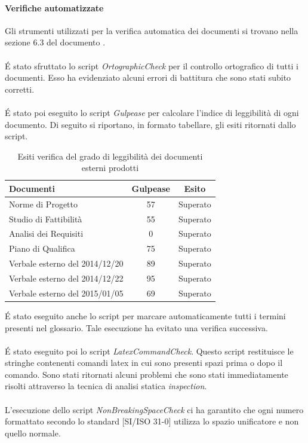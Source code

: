 				\paragraph{Verifiche automatizzate}
					Gli strumenti utilizzati per la verifica automatica dei documenti si trovano nella sezione 6.3 del documento .\\\\
					É stato sfruttato lo script \textit{OrtographicCheck} per  il controllo ortografico di tutti i documenti. Esso ha evidenziato alcuni errori di battitura che sono stati subito corretti.\\\\
					É stato poi eseguito lo script \textit{Gulpease} per calcolare l'indice di leggibilità di ogni documento. Di seguito si riportano, in formato tabellare, gli esiti ritornati dallo script.
					\begin{table}[H]\centering
						\begin{tabu}{| l | c | c |}
							\hline
							Documenti 				& Gulpease	& Esito  \\ \hline
							
							Norme di Progetto 				& 57		& Superato 		 \\
							Studio di Fattibilità 				& 55		& Superato 		 \\
							Analisi dei Requisiti	 			& 0		& Superato 		 \\
							Piano di Qualifica 				& 75		& Superato 	 \\
							Verbale esterno del 2014/12/20 	& 89 		& Superato	\\
							Verbale esterno del 2014/12/22	 	& 95		& Superato 	\\ 
							Verbale esterno del 2015/01/05		& 69		& Superato\\ \hline 
						\end{tabu}
						\caption{Esiti verifica del grado di leggibilità dei documenti esterni prodotti}
					\end{table}
					É stato eseguito anche lo script per marcare automaticamente tutti i termini presenti nel glossario. Tale esecuzione ha evitato una verifica successiva.\\\\
					É stato eseguito poi lo script \textit{LatexCommandCheck}. Questo script restituisce le stringhe contenenti comandi latex in cui sono presenti spazi prima o dopo il comando. Sono stati ritornati alcuni problemi che sono stati immediatamente risolti attraverso la tecnica di analisi statica \textit{inspection}.\\\\
					L'esecuzione dello script \textit{NonBreakingSpaceCheck} ci ha garantito che ogni numero formattato secondo lo standard [SI/ISO 31-0] utilizza lo spazio unificatore e non quello normale.
